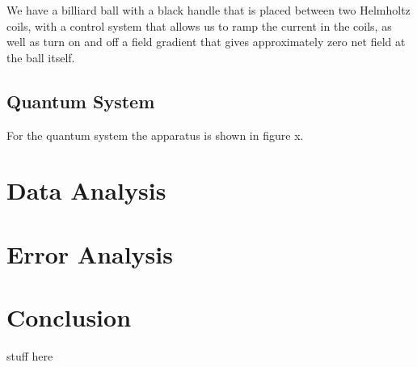 \documentclass{article}
\begin{document}

	We have a billiard ball with a black handle that is placed between two Helmholtz coils, with a control system that allows us to ramp the current in the coils, as well as turn on and off a field gradient that gives approximately zero net field at the ball itself.

	\subsection{Quantum System}
	For the quantum system the apparatus is shown in figure x.




\section{Data Analysis}

\section{Error Analysis}

\section{Conclusion}

\begin{thebibliography}{10}
	stuff here\\
\end{thebibliography}
\end{document}
